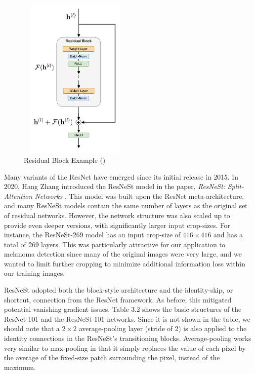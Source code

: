 \documentclass [MAS] {uclathes}
\begin{document}
\begin{figure}[h]
\centering
\includegraphics[height = 80mm, width= 55mm]{imgs/resblock.png}
\caption{Residual Block Example (\cite{resnet})}
\label{fig:res_block}
\end{figure}

Many variants of the ResNet have emerged since its initial release in 2015. In 2020, Hang Zhang introduced the ResNeSt model in the paper, \textit{ResNeSt: Split-Attention Networks} \cite{resnest}. This model was built upon the ResNet meta-architecture, and many ResNeSt models contain the same number of layers as the original set of residual networks. However, the network structure was also scaled up to provide even deeper versions, with significantly larger input crop-sizes. For instance, the ResNeSt-269 model has an input crop-size of $416 \times 416$ and has a total of 269 layers. This was particularly attractive for our application to melanoma detection since many of the original images were very large, and we wanted to limit further cropping to minimize additional information loss within our training images.

ResNeSt adopted both the block-style architecture and the identity-skip, or shortcut, connection from the ResNet framework. As before, this mitigated potential vanishing gradient issues. Table 3.2 shows the basic structures of the ResNet-101 and the ResNeSt-101 networks. Since it is not shown in the table, we should note that a $2 \times 2$ average-pooling layer (stride of 2) is also applied to the identity connections in the ResNeSt's transitioning blocks. Average-pooling works very similar to max-pooling in that it simply replaces the value of each pixel by the average of the fixed-size patch surrounding the pixel, instead of the maximum. 
\end{document}
